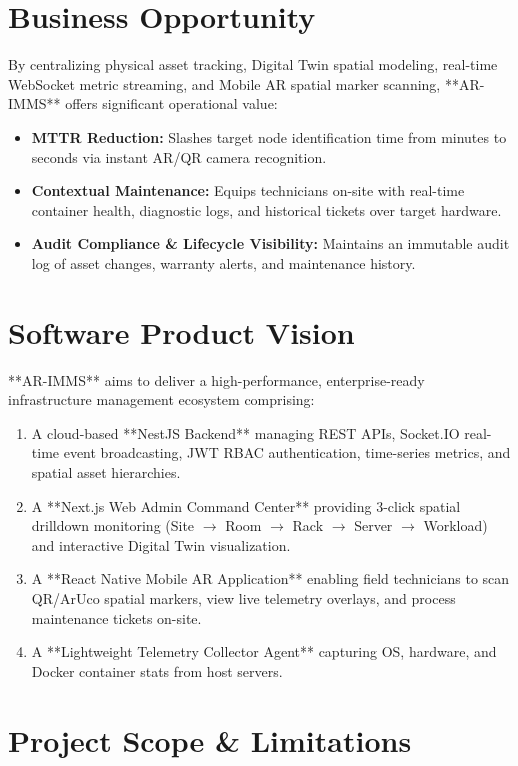\section{Business Opportunity}
By centralizing physical asset tracking, Digital Twin spatial modeling, real-time WebSocket metric streaming, and Mobile AR spatial marker scanning, **AR-IMMS** offers significant operational value:
\begin{itemize}
    \item \textbf{MTTR Reduction:} Slashes target node identification time from minutes to seconds via instant AR/QR camera recognition.
    \item \textbf{Contextual Maintenance:} Equips technicians on-site with real-time container health, diagnostic logs, and historical tickets over target hardware.
    \item \textbf{Audit Compliance \& Lifecycle Visibility:} Maintains an immutable audit log of asset changes, warranty alerts, and maintenance history.
\end{itemize}

\section{Software Product Vision}
**AR-IMMS** aims to deliver a high-performance, enterprise-ready infrastructure management ecosystem comprising:
\begin{enumerate}
    \item A cloud-based **NestJS Backend** managing REST APIs, Socket.IO real-time event broadcasting, JWT RBAC authentication, time-series metrics, and spatial asset hierarchies.
    \item A **Next.js Web Admin Command Center** providing 3-click spatial drilldown monitoring (Site $\rightarrow$ Room $\rightarrow$ Rack $\rightarrow$ Server $\rightarrow$ Workload) and interactive Digital Twin visualization.
    \item A **React Native Mobile AR Application** enabling field technicians to scan QR/ArUco spatial markers, view live telemetry overlays, and process maintenance tickets on-site.
    \item A **Lightweight Telemetry Collector Agent** capturing OS, hardware, and Docker container stats from host servers.
\end{enumerate}

\section{Project Scope \& Limitations}

